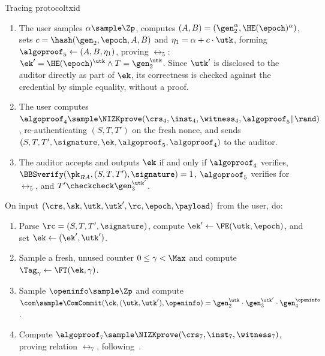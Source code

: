 \begin{protocolbox}{Tracing protocol}{txid}
\begin{description}
\begin{enumerate}
        \item The user samples $\alpha \sample \Zp$, computes $(A,B) =
          (\gen_2^{\alpha},\HE(\epoch)^{\alpha})$, sets $c =
          \hash(\gen_2,\epoch,A,B)$ and $\eta_1 = \alpha + c\cdot\utk$, forming
          $\algoproof_5 \leftarrow (A,B,\eta_1)$, proving $\rel_5$: $\ek' =
          \HE(\epoch)^{\utk} \wedge T = \gen_2^{\utk}$. Since $\utk'$ is
          disclosed to the auditor directly as part of $\ek$, its correctness
          is checked against the credential by simple equality, without a
          proof.

        \item The user computes $\algoproof_4 \sample
          \NIZKprove(\crs_4,\inst_4,\witness_4,\algoproof_5\|\rand)$,
          re-authenticating $(S,T,T')$ on the fresh nonce, and sends
          $(S,T,T',\signature,\ek,\algoproof_5,\algoproof_4)$ to the auditor.

        \item The auditor accepts and outputs $\ek$ if and only if
          $\algoproof_4$ verifies, $\BBSverify(\pk_{RA},(S,T,T'),\signature) =
          1$, $\algoproof_5$ verifies for $\rel_5$, and $T' \checkcheck
          \gen_3^{\utk'}$.

      \end{enumerate}

    \item[$\tx \sample \IDsubmit(\crs,\sk,\utk,\utk',\rc,\epoch,\payload)$ :]
      On input $(\crs,\sk,\utk,\utk',\rc,\epoch,\payload)$ from the user, do:

      \begin{enumerate}

        \item Parse $\rc = (S,T,T',\signature)$, compute $\ek' \leftarrow
          \FE(\utk,\epoch)$, and set $\ek \leftarrow (\ek',\utk')$.

        \item Sample a fresh, unused counter $0 \leq \gamma < \Max$ and compute
          $\Tag_\gamma \leftarrow \FT(\ek,\gamma)$.

        \item Sample $\openinfo \sample \Zp$ and compute $\com \sample
          \ComCommit(\ck,(\utk,\utk'),\openinfo) = \gen_2^{\utk} \cdot
          \gen_3^{\utk'} \cdot \gen_4^{\openinfo}$.

        \item Compute $\algoproof_7 \sample
          \NIZKprove(\crs_7,\inst_7,\witness_7)$, proving relation $\rel_7$,
          following~.


\end{enumerate}
\end{description}
\end{protocolbox}
